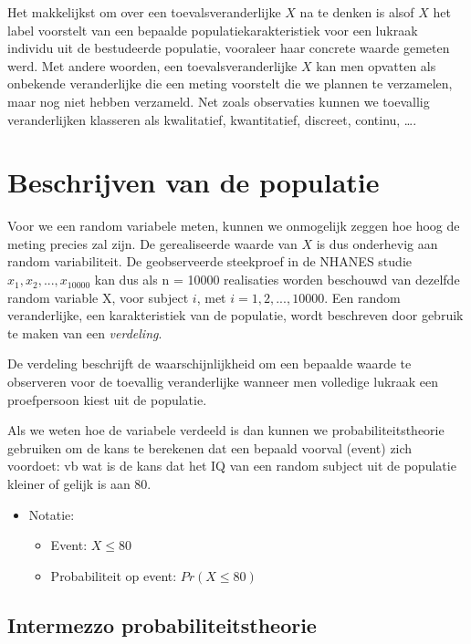 \documentclass[
  12pt,dutch,coursenotes]{book}
\providecommand{\tightlist}{%
  \setlength{\itemsep}{0pt}\setlength{\parskip}{0pt}}
\begin{document}
Het makkelijkst om over een toevalsveranderlijke \(X\) na te denken is alsof \(X\) het label voorstelt van
een bepaalde populatiekarakteristiek voor een lukraak individu uit de
bestudeerde populatie, vooraleer haar concrete waarde gemeten werd.
Met andere woorden, een toevalsveranderlijke \(X\) kan men opvatten als onbekende veranderlijke die een meting voorstelt die we plannen te verzamelen, maar nog niet hebben verzameld.
Net zoals observaties kunnen we toevallig veranderlijken klasseren als kwalitatief, kwantitatief, discreet, continu, \ldots.

\hypertarget{beschrijven-van-de-populatie}{%
\section{Beschrijven van de populatie}\label{beschrijven-van-de-populatie}}

Voor we een random variabele meten, kunnen we onmogelijk zeggen hoe hoog de meting precies zal zijn.
De gerealiseerde waarde van \(X\) is dus onderhevig aan random variabiliteit.
De geobserveerde steekproef in de NHANES studie \(x_1, x_2, . . . , x_{10000}\) kan dus als n = 10000 realisaties worden beschouwd van dezelfde random variable X, voor subject \(i\), met \(i = 1,2,...,10000\).
Een random veranderlijke, een karakteristiek van de populatie, wordt beschreven door gebruik te maken van een \emph{verdeling}.

De verdeling beschrijft de waarschijnlijkheid om een bepaalde waarde te observeren voor de toevallig veranderlijke wanneer men volledige lukraak een proefpersoon kiest uit de populatie.

Als we weten hoe de variabele verdeeld is dan kunnen we probabiliteitstheorie gebruiken om de kans te berekenen dat een bepaald voorval (event) zich voordoet: vb wat is de kans dat het IQ van een random subject uit de populatie kleiner of gelijk is aan 80.

\begin{itemize}
\item
  Notatie:

  \begin{itemize}
  \tightlist
  \item
    Event: \(X \leq 80\)
  \item
    Probabiliteit op event: \(Pr(X \leq 80)\)
  \end{itemize}
\end{itemize}

\hypertarget{intermezzo-probabiliteitstheorie}{%
\subsection{Intermezzo probabiliteitstheorie}\label{intermezzo-probabiliteitstheorie}}
\end{document}
